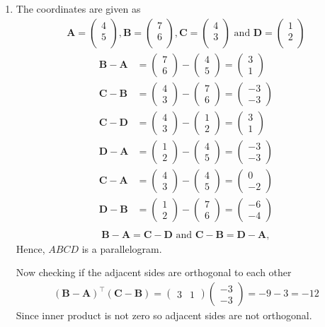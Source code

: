 \documentclass[12pt]{article}
\newcommand{\myvec}[1]{\ensuremath{\begin{pmatrix}#1\end{pmatrix}}}
\let\vec\mathbf
\begin{document}
\begin{enumerate}
\item The coordinates are given as
	\begin{align}
	\vec{A} = \myvec{
		4\\
		5\\
		},
	\vec{B} = \myvec{
		7\\
		6\\
		},
	\vec{C} = \myvec{
		4\\
		3\\
		} \text{ and }
	\vec{D} = \myvec{
		1\\
		2\\
		}
	\end{align}
	\begin{align}
		\vec{B} - \vec{A} &= \myvec{7\\6} - \myvec{4\\5} = \myvec{3\\1}\\
		\vec{C} - \vec{B} &= \myvec{4\\3} - \myvec{7\\6} = \myvec{-3\\-3}\\
		\vec{C} - \vec{D} &= \myvec{4\\3} - \myvec{1\\2} = \myvec{3\\1}\\
		\vec{D} - \vec{A} &= \myvec{1\\2} - \myvec{4\\5} = \myvec{-3\\-3}\\
		\vec{C} - \vec{A} &= \myvec{4\\3} - \myvec{4\\5} = \myvec{0\\-2}\\
		\vec{D} - \vec{B} &= \myvec{1\\2} - \myvec{7\\6} = \myvec{-6\\-4}\\
	\end{align}
	\begin{align}
		\vec{B}-\vec{A} = \vec{C}-\vec{D} \text{ and } \vec{C}-\vec{B} = \vec{D}-\vec{A},
	\end{align}
	Hence, $ABCD$ is a parallelogram.

	Now checking if the adjacent sides are orthogonal to each other
	\begin{align}
		(\vec{B}-\vec{A})^\top (\vec{C}-\vec{B}) = \myvec{3&1} \myvec{-3\\-3} = -9-3 = -12
	\end{align}
	Since inner product is not zero so adjacent sides are not orthogonal.


\end{enumerate}
\end{document}
